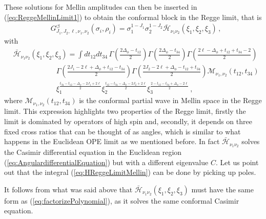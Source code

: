 These solutions for Mellin amplitudes can then be inserted in (\ref{eq:ReggeMellinLimit1}) to obtain the conformal block in the Regge limit, that is
\begin{align}
   & G_{J_1,J_2,\ell,\nu_1,\nu_2}^{\circlearrowleft} (\sigma_i,\rho_i)=  \sigma_{1}^{1-J_1} \sigma_{2}^{1-J_2} \bar{\mathcal{H}}_{\nu_1\nu_2} (\xi_1,\xi_2,\xi_3)  \,,
\end{align}
with
\begin{align}
   & \bar{\mathcal{H}}_{\nu_1\nu_2} (\xi_1,\xi_2,\xi_3)=\int dt_{12}dt_{34}\, \Gamma\! \left(\frac{2\Delta_{\phi}-t_{12}}{2}\right)\Gamma\! \left(\frac{2\Delta_{\phi}-t_{34}}{2}\right)\Gamma\! \left(\frac{2 \ell -\Delta_{ \phi} +t_{12}+t_{34}-2}{2} \right)\nonumber \\
   & \qquad\qquad\qquad
  \Gamma\!\left(\frac{2 J_1-2 \ell +\Delta_{ \phi} +t_{12}-t_{34}}{2} \right) \Gamma \!\left(\frac{2 J_2-2 \ell +\Delta_{ \phi}-t_{12}+t_{34}}{2} \right)\mathcal{M}_{\nu_1,\nu_2}(t_{12},t_{34})  \nonumber                                                                         \\
   & \qquad\qquad\qquad
  \xi_1 ^{\frac{t_{34}-t_{12}-\Delta_\phi -2 J_1+2 \ell }{2} } \xi_2 ^{\frac{t_{12}-t_{34}-\Delta_\phi -2 J_2+2 \ell }{2} }\xi_3 ^{\frac{2-t_{12}-t_{34}+\Delta_\phi -2 \ell }{2}}\,,
  \label{eq:HReggeLimitMellin}
\end{align}
where $\mathcal{M}_{\nu_1,\nu_2}(t_{12},t_{34})$ is the conformal partial wave in Mellin space in the Regge limit. This expression highlights two properties of the Regge limit, firstly the limit is dominated by operators of
high spin and, secondly, it depends on three fixed cross ratios that can be thought of as angles, which is similar to  what happens in the Euclidean OPE limit as we mentioned before. In fact $\bar{\mathcal{H}}_{\nu_1\nu_2} $ solves the Casimir differential equation in the Euclidean region (\ref{eq:AngulardifferentialEquation}) but with a different eigenvalue $C$.  Let us point out that the integral (\ref{eq:HReggeLimitMellin}) can be done by picking up poles.

It follows from what was said above that  $\bar{\mathcal{H}}_{\nu_1\nu_2} (\xi_1,\xi_2,\xi_3)$ must have the same form as (\ref{eq:factorizePolynomial}), as it solves the same conformal Casimir equation.




